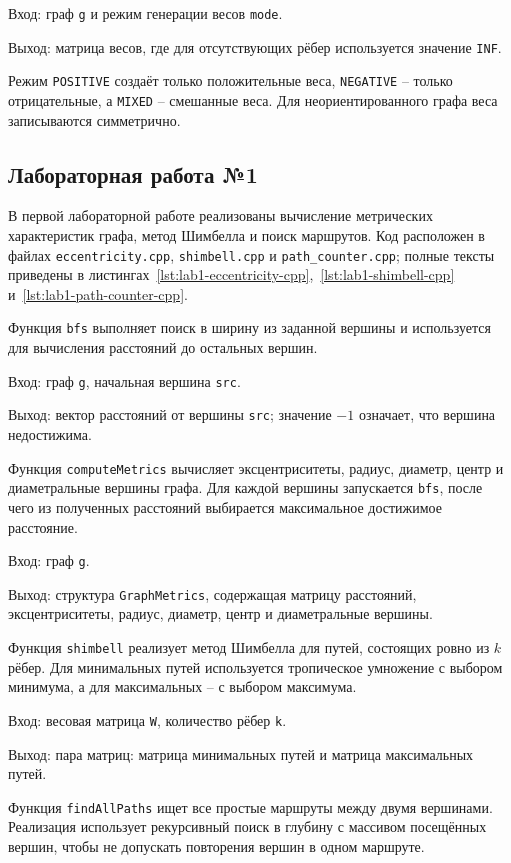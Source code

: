 \documentclass[a4paper,final]{article}
\begin{document}
Вход: граф \texttt{g} и режим генерации весов \texttt{mode}.

Выход: матрица весов, где для отсутствующих рёбер используется значение \texttt{INF}.

Режим \texttt{POSITIVE} создаёт только положительные веса, \texttt{NEGATIVE} -- только отрицательные, а \texttt{MIXED} -- смешанные веса. Для неориентированного графа веса записываются симметрично.

\subsection{Лабораторная работа №1}

В первой лабораторной работе реализованы вычисление метрических характеристик графа, метод Шимбелла и поиск маршрутов. Код расположен в файлах \texttt{eccentricity.cpp}, \texttt{shimbell.cpp} и \texttt{path\_counter.cpp}; полные тексты приведены в листингах~\ref{lst:lab1-eccentricity-cpp},~\ref{lst:lab1-shimbell-cpp} и~\ref{lst:lab1-path-counter-cpp}.

Функция \texttt{bfs} выполняет поиск в ширину из заданной вершины и используется для вычисления расстояний до остальных вершин.

Вход: граф \texttt{g}, начальная вершина \texttt{src}.

Выход: вектор расстояний от вершины \texttt{src}; значение $-1$ означает, что вершина недостижима.

Функция \texttt{computeMetrics} вычисляет эксцентриситеты, радиус, диаметр, центр и диаметральные вершины графа. Для каждой вершины запускается \texttt{bfs}, после чего из полученных расстояний выбирается максимальное достижимое расстояние.

Вход: граф \texttt{g}.

Выход: структура \texttt{GraphMetrics}, содержащая матрицу расстояний, эксцентриситеты, радиус, диаметр, центр и диаметральные вершины.

Функция \texttt{shimbell} реализует метод Шимбелла для путей, состоящих ровно из $k$ рёбер. Для минимальных путей используется тропическое умножение с выбором минимума, а для максимальных -- с выбором максимума.

Вход: весовая матрица \texttt{W}, количество рёбер \texttt{k}.

Выход: пара матриц: матрица минимальных путей и матрица максимальных путей.

Функция \texttt{findAllPaths} ищет все простые маршруты между двумя вершинами. Реализация использует рекурсивный поиск в глубину с массивом посещённых вершин, чтобы не допускать повторения вершин в одном маршруте.
\end{document}
